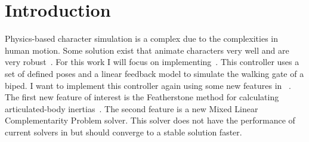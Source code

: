 
\section{Introduction}
\label{sec:Intro}


Physics-based character simulation is a complex due to the complexities in human motion.
Some solution exist that animate characters very well and are very robust~\cite{Yin07,Coros09}.
For this work I will focus on implementing~\cite{Yin07}.
This controller uses a set of defined poses and a linear feedback model to simulate the walking gate of a biped.
I want to implement this controller again using some new features in \bulletPhysics~\cite{coumans2013bullet}.
The first new feature of interest is the Featherstone method for calculating articulated-body inertias~\cite{featherstone2014rigid}. 
The second feature is a new Mixed Linear Complementarity Problem solver. %
This solver does not have the performance of current solvers in \bulletPhysics but should converge to a stable solution faster.

\begin{comment}
\begin{enumerate}
	\item {Character simulation is a complex problem}
	\item {Some solution exist for this problem that are very robust}
	\item {In particular "Generalized biped motion"}
	\item {This controller is supposed to model the character animation problem in a general way.}
	\item {I want to implement this controller again using some new features in \bulletPhysics}
\end{enumerate}
\end{comment}